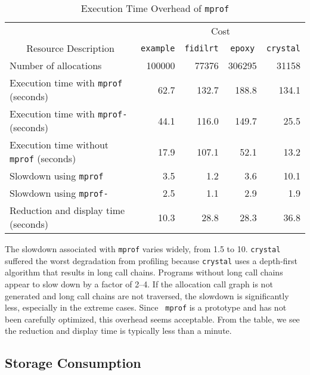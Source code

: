 \begin{table}[htbp]
\begin{singlespace}
\begin{center}
\begin{tabular}{|l|r|r|r|r|} \hline
\multicolumn{1}{|c|}{} & \multicolumn{4}{|c|}{Cost} \\ \cline{2-5}
\multicolumn{1}{|c|}{Resource Description} & 
\multicolumn{1}{|c|}{\tt example} & 
\multicolumn{1}{|c|}{\tt fidilrt} & 
\multicolumn{1}{|c|}{\tt epoxy} & 
\multicolumn{1}{|c|}{\tt crystal} \\ \hline
Number of allocations & 100000 & 77376 & 306295 & 31158 \\
Execution time with {\tt mprof} (seconds) & 62.7 & 132.7 & 188.8 & 134.1 \\
Execution time with {\tt mprof-} (seconds) & 44.1 & 116.0 & 149.7 & 25.5 \\
Execution time without {\tt mprof} (seconds) & 17.9 & 107.1 & 52.1 & 13.2 \\
\hline
Slowdown using {\tt mprof} & 3.5 & 1.2 & 3.6 & 10.1 \\
Slowdown using {\tt mprof-} & 2.5 & 1.1 & 2.9 & 1.9 \\
\hline 
Reduction and display time (seconds) & 10.3 & 28.8 & 28.3 & 36.8 \\
\hline 
\end{tabular}
\caption{Execution Time Overhead of {\tt mprof}}
\label{cpu:tab}
\end{center}
\end{singlespace}
\end{table}

The slowdown associated with {\tt mprof} varies widely, from 1.5 to
10.  {\tt crystal} suffered the worst degradation from profiling
because {\tt crystal} uses a depth-first algorithm that results in
long call chains.  Programs without long call chains appear to slow
down by a factor of 2--4.  If the allocation call graph is not
generated and long call chains are not traversed, the slowdown is
significantly less, especially in the extreme cases.  Since {\tt
mprof} is a prototype and has not been carefully optimized, this
overhead seems acceptable.  From the table, we see the reduction and
display time is typically less than a minute.

\subsection{Storage Consumption}
\label{mmeas:sec}

